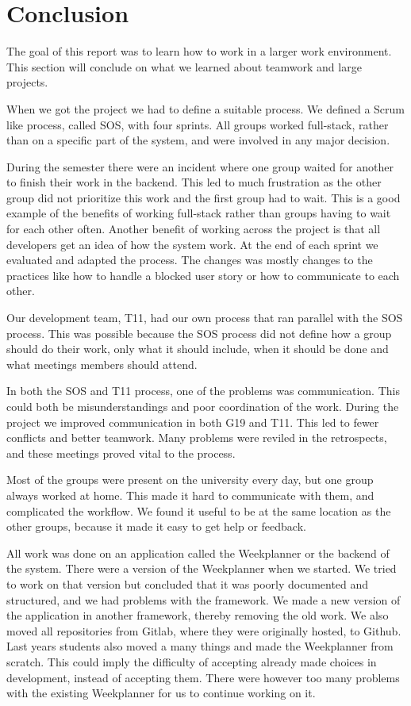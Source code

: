 \section{Conclusion}
The goal of this report was to learn how to work in a larger work environment. This section will conclude on what we learned about teamwork and large projects. 

When we got the project we had to define a suitable process. We defined a Scrum like process, called \gls{SOS}, with four sprints. All groups worked full-stack, rather than on a specific part of the system, and were involved in any major decision. 

During the semester there were an incident where one group waited for another to finish their work in the backend. This led to much frustration as the other group did not prioritize this work and the first group had to wait. This is a good example of the benefits of working full-stack rather than groups having to wait for each other often. Another benefit of working across the project is that all developers get an idea of how the system work.
At the end of each sprint we evaluated and adapted the process. The changes was mostly changes to the practices like how to handle a blocked user story or how to communicate to each other.

Our development team, \gls{T11}, had our own process that ran parallel with the \gls{SOS} process. This was possible because the \gls{SOS} process did not define how a group should do their work, only what it should include, when it should be done and what meetings members should attend. 

In both the \gls{SOS} and \gls{T11} process, one of the problems was communication. This could both be misunderstandings and poor coordination of the work. During the project we improved communication in both \gls{G19} and \gls{T11}. This led to fewer conflicts and better teamwork. Many problems were reviled in the retrospects, and these meetings proved vital to the process. 

Most of the groups were present on the university every day, but one group always worked at home. This made it hard to communicate with them, and complicated the workflow. We found it useful to be at the same location as the other groups, because it made it easy to get help or feedback.

All work was done on an application called the Weekplanner or the backend of the system. There were a version of the Weekplanner when we started. We tried to work on that version but concluded that it was poorly documented and structured, and we had problems with the framework. We made a new version of the application in another framework, thereby removing the old work. We also moved all repositories from Gitlab, where they were originally hosted, to Github. Last years students also moved a many things and made the Weekplanner from scratch. This could imply the difficulty of accepting already made choices in development, instead of accepting them. There were however too many problems with the existing Weekplanner for us to continue working on it. 

